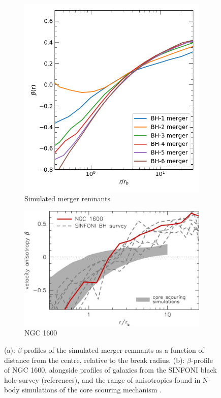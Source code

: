 \documentclass[english, oneside]{HYgradu}
\begin{document}
\begin{figure}
	\centering
	\begin{subfigure}[b]{0.39\textwidth}
		\includegraphics[width=\textwidth]{beta.png}	
		\caption{Simulated merger remnants}
	\end{subfigure}
	\begin{subfigure}[b]{0.60\textwidth}
		\includegraphics[width=\textwidth]{thomas2016.jpg}
		\caption{NGC 1600}
	\end{subfigure}
	\caption{(a): $\beta$-profiles of the simulated merger remnants as a function of distance from the centre, relative to the break radius. (b): $\beta$-profile of NGC 1600, alongside profiles of galaxies from the SINFONI black hole survey (references), and the range of anisotropies found in N-body simulations of the core scouring mechanism \citep{Thomas2016}.}
	\label{figure:beta_NGC1600_Simul}
\end{figure}
\end{document}
